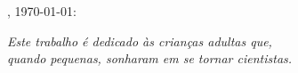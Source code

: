 %
% 
%
\begin{folhadeaprovacao}

  \begin{center}
    {\ABNTEXchapterfont\large\imprimirautor}

    \vspace*{\fill}\vspace*{\fill}
    {\ABNTEXchapterfont\bfseries\Large\imprimirtitulo}
    \vspace*{\fill}
    
    \hspace{.45\textwidth}
    \begin{minipage}{.5\textwidth}
        \imprimirpreambulo
    \end{minipage}%
    \vspace*{\fill}
   \end{center}
    
   \imprimirlocal, \today:

      
   \begin{center}
    \vspace*{0.5cm}
    {\large\imprimirlocal}
    \par
    {\large\imprimirdata}
    \vspace*{1cm}
  \end{center}
  
\end{folhadeaprovacao}

\begin{dedicatoria}
	\vspace*{\fill}
	\centering
	\noindent
	\textit{ Este trabalho é dedicado às crianças adultas que,\\
		quando pequenas, sonharam em se tornar cientistas.} \vspace*{\fill}
\end{dedicatoria}

